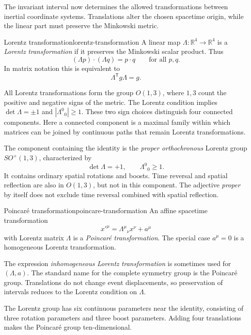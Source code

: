 \documentclass[11pt,a4paper]{article}
\newcommand{\R}{\mathbb{R}}
\newcommand{\transpose}{\mathsf{T}}
\begin{document}
The invariant interval now determines the allowed transformations between
inertial coordinate systems. Translations alter the chosen spacetime origin,
while the linear part must preserve the Minkowski metric.

\begin{definition}{Lorentz transformation}{lorentz-transformation}
A linear map \(\Lambda:\R^4\to\R^4\) is a \emph{Lorentz transformation} if it
preserves the Minkowski scalar product. Thus
\[
  (\Lambda p)\cdot(\Lambda q)=p\cdot q
  \qquad\text{for all }p,q.
\]
In matrix notation this is equivalent to
\[
\boxed{\Lambda^{\transpose}g\Lambda=g.}
\]
\end{definition}

All Lorentz transformations form the group \(O(1,3)\), where \(1,3\) count
the positive and negative signs of the metric. The Lorentz condition implies
\(\det\Lambda=\pm1\) and \(|\Lambda^0{}_0|\geq1\). These two sign choices
distinguish four connected components. Here a connected component is a
maximal family within which matrices can be joined by continuous paths that
remain Lorentz transformations.

The component containing the identity is the \emph{proper orthochronous}
Lorentz group \(SO^+(1,3)\), characterized by
\[
  \det\Lambda=+1,\qquad \Lambda^0{}_0\geq1.
\]
It contains ordinary spatial rotations and boosts. Time reversal and spatial
reflection are also in \(O(1,3)\), but not in this component. The adjective
\emph{proper} by itself does not exclude time reversal combined with spatial
reflection.

\begin{definition}{Poincar\'e transformation}{poincare-transformation}
An affine spacetime transformation
\[
  x'^\mu=\Lambda^\mu{}_\nu x^\nu+a^\mu
\]
with Lorentz matrix \(\Lambda\) is a \emph{Poincar\'e transformation}. The
special case \(a^\mu=0\) is a homogeneous Lorentz transformation.
\end{definition}

\begin{precision}
The expression \emph{inhomogeneous Lorentz transformation} is sometimes used
for \((\Lambda,a)\). The standard name for the complete symmetry group is the
Poincar\'e group. Translations do not change event displacements, so preservation
of intervals reduces to the Lorentz condition on \(\Lambda\).
\end{precision}

The Lorentz group has six continuous parameters near the identity, consisting
of three rotation parameters and three boost parameters. Adding four
translations makes the Poincar\'e group ten-dimensional.
\end{document}

